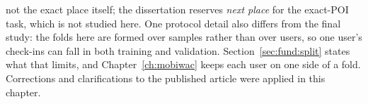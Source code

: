 \begin{chapterpreface}
not the exact place itself; the dissertation reserves \emph{next place} for the
exact-POI task, which is not studied here.
One protocol detail also differs from the final study: the folds here are formed over
samples rather than over users, so one user's check-ins can fall in both training and
validation. Section~\ref{sec:fund:split} states what that limits, and
Chapter~\ref{ch:mobiwac} keeps each user on one side of a fold.
Corrections and clarifications to the published article were applied in this chapter.

\end{chapterpreface}
